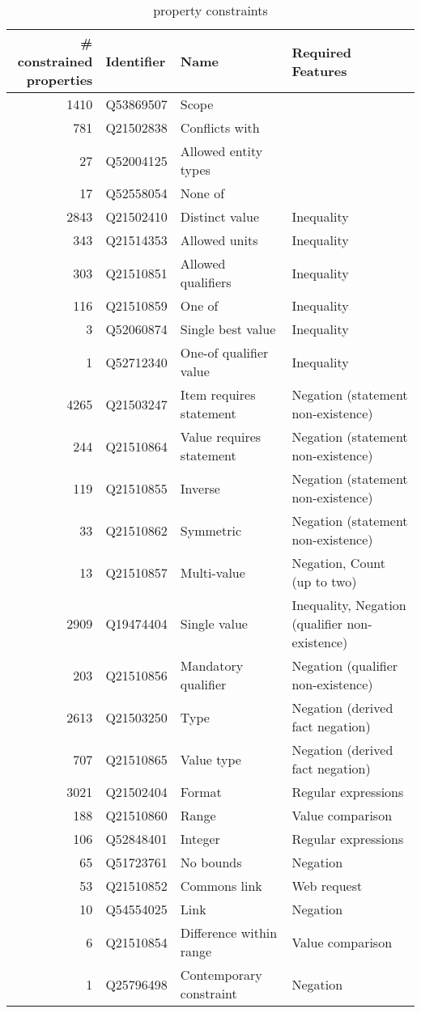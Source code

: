 \documentclass[hyperref,bachelorofscience,fleqn]{cgvpub}
\begin{document}
\begin{table}[H]
\caption{property constraints}\label{tab_property_constraints}
\begin{tabularx}{\textheight}{rlll}
\makecell{\# constrained\\ properties} & Identifier & Name & Required Features \\
\hline
1410 & Q53869507 & Scope &  \\
781 & Q21502838 & Conflicts with &  \\
27 & Q52004125 & Allowed entity types &  \\
17 & Q52558054 & None of &  \\
\hline
2843 & Q21502410 & Distinct value & Inequality \\
343 & Q21514353 & Allowed units & Inequality \\
303 & Q21510851 & Allowed qualifiers & Inequality \\
116 & Q21510859 & One of & Inequality \\
3 & Q52060874 & Single best value & Inequality \\
1 & Q52712340 & One-of qualifier value & Inequality \\
\hline
4265 & Q21503247 & Item requires statement & Negation (statement non-existence) \\
244 & Q21510864 & Value requires statement & Negation (statement non-existence) \\
119 & Q21510855 & Inverse & Negation (statement non-existence) \\
33 & Q21510862 & Symmetric & Negation (statement non-existence) \\
13 & Q21510857 & Multi-value & Negation, Count (up to two) \\
2909 & Q19474404 & Single value & Inequality, Negation (qualifier non-existence) \\
203 & Q21510856 & Mandatory qualifier & Negation (qualifier non-existence) \\
\hline
2613 & Q21503250 & Type & Negation (derived fact negation) \\
707 & Q21510865 & Value type & Negation (derived fact negation) \\
3021 & Q21502404 & Format & Regular expressions \\
188 & Q21510860 & Range & Value comparison \\
106 & Q52848401 & Integer & Regular expressions \\
65 & Q51723761 & No bounds & Negation \\
53 & Q21510852 & Commons link & Web request \\
10 & Q54554025 & Link & Negation \\
6 & Q21510854 & Difference within range & Value comparison \\
1 & Q25796498 & Contemporary constraint & Negation \\
\end{tabularx}
\end{table}
\end{document}
